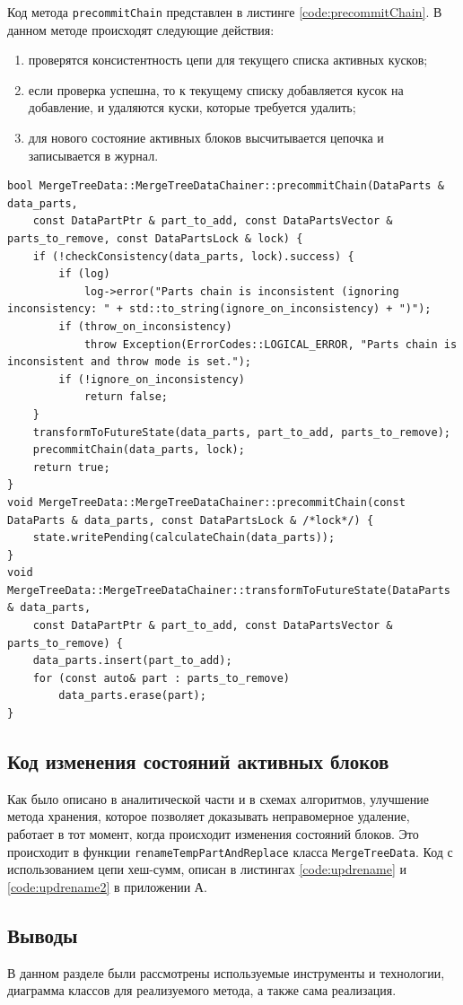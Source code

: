 Код метода \texttt{precommitChain} представлен в листинге \ref{code:precommitChain}. В данном методе происходят следующие действия:
\begin{enumerate}
    \item проверятся консистентность цепи для текущего списка активных кусков;
    \item если проверка успешна, то к текущему списку добавляется кусок на добавление, и удаляются куски, которые требуется удалить;
    \item для нового состояние активных блоков высчитывается цепочка и записывается в журнал.
\end{enumerate}

\pagebreak

\begin{lstlisting}[label=code:precommitChain, caption={Метод \texttt{precommitChain}.}]
bool MergeTreeData::MergeTreeDataChainer::precommitChain(DataParts & data_parts,
    const DataPartPtr & part_to_add, const DataPartsVector & parts_to_remove, const DataPartsLock & lock) {
    if (!checkConsistency(data_parts, lock).success) {
        if (log)
            log->error("Parts chain is inconsistent (ignoring inconsistency: " + std::to_string(ignore_on_inconsistency) + ")");
        if (throw_on_inconsistency)
            throw Exception(ErrorCodes::LOGICAL_ERROR, "Parts chain is inconsistent and throw mode is set.");
        if (!ignore_on_inconsistency)
            return false;
    }
    transformToFutureState(data_parts, part_to_add, parts_to_remove);
    precommitChain(data_parts, lock);
    return true;
}
void MergeTreeData::MergeTreeDataChainer::precommitChain(const DataParts & data_parts, const DataPartsLock & /*lock*/) {
    state.writePending(calculateChain(data_parts));
}
void MergeTreeData::MergeTreeDataChainer::transformToFutureState(DataParts & data_parts,
    const DataPartPtr & part_to_add, const DataPartsVector & parts_to_remove) {
    data_parts.insert(part_to_add);
    for (const auto& part : parts_to_remove)
        data_parts.erase(part);
}
\end{lstlisting}

\subsection{Код изменения состояний активных блоков}

Как было описано в аналитической части и в схемах алгоритмов, улучшение метода хранения, которое позволяет доказывать неправомерное удаление, работает в тот момент, когда происходит изменения состояний блоков. Это происходит в функции \texttt{renameTempPartAndReplace} класса \texttt{MergeTreeData}. Код с использованием цепи хеш-сумм, описан в листингах \ref{code:updrename} и \ref{code:updrename2} в приложении А.

\subsection{Выводы}

В данном разделе были рассмотрены используемые инструменты и технологии, диаграмма классов для реализуемого метода, а также сама реализация.

\pagebreak